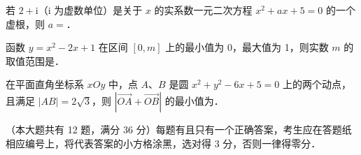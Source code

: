 \begin{question}
若 \(2+\mathrm{i}\)（\(\mathrm{i}\) 为虚数单位）是关于 \(x\) 的实系数一元二次方程 \(x^{2}+ax+5=0\) 的一个虚根，则 \(a=\)\gkblank{}．

\end{question}
\begin{question}
函数 \(y=x^{2}-2x+1\) 在区间 \([0,m]\) 上的最小值为 0，最大值为 1，则实数 \(m\) 的取值范围是\gkblank{}．

\end{question}
\begin{question}
在平面直角坐标系 \(xOy\) 中，点 \(A\)、\(B\) 是圆 \(x^{2}+y^{2}-6x+5=0\) 上的两个动点，且满足 \(|AB|=2\sqrt{3}\)，则 \(\left|\overrightarrow{OA}+\overrightarrow{OB}\right|\) 的最小值为\gkblank{}．

\end{question}

（本大题共有 12 题，满分 36 分）每题有且只有一个正确答案，考生应在答题纸相应编号上，将代表答案的小方格涂黑，选对得 3 分，否则一律得零分．

